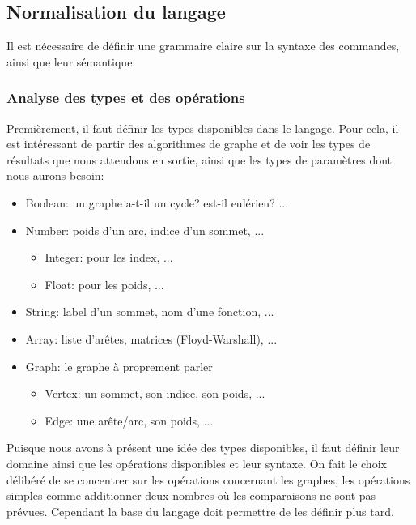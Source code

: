 \documentclass[french]{article}
\begin{document}
		\subsection{Normalisation du langage} 
			Il est nécessaire de définir une grammaire claire sur la syntaxe des commandes, ainsi que leur sémantique.
			
			\subsubsection{Analyse des types et des opérations} 
				Premièrement, il faut définir les types disponibles dans le langage. Pour cela, il est intéressant de partir des algorithmes de graphe et de voir les types de résultats que nous attendons en sortie, ainsi que les types de paramètres dont nous aurons besoin:
			
				\begin{itemize}
					\item Boolean: un graphe a-t-il un cycle? est-il eulérien? ...
					\item Number: poids d'un arc, indice d'un sommet, ...
					\begin{itemize}
						\item Integer: pour les index, ...
						\item Float: pour les poids, ...
					\end{itemize}
					\item String: label d'un sommet, nom d'une fonction, ...
					\item Array: liste d'arêtes, matrices (Floyd-Warshall), ...
					\item Graph: le graphe à proprement parler
					\begin{itemize}
						\item Vertex: un sommet, son indice, son poids, ...
						\item Edge: une arête/arc, son poids, ...
					\end{itemize}
				\end{itemize} 
			
				Puisque nous avons à présent une idée des types disponibles, il faut définir leur domaine ainsi que les opérations disponibles et leur syntaxe. On fait le choix délibéré de se concentrer sur les opérations concernant les graphes, les opérations simples comme additionner deux nombres où les comparaisons ne sont pas prévues. Cependant la base du langage doit permettre de les définir plus tard. 
			
\end{document}
